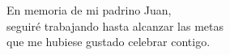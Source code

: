 \clearpage\null\newpage

\begin{dedication}
	En memoria de mi padrino Juan, \\
	seguiré trabajando hasta alcanzar las metas\\
	que me hubiese gustado celebrar contigo. 
\end{dedication}
